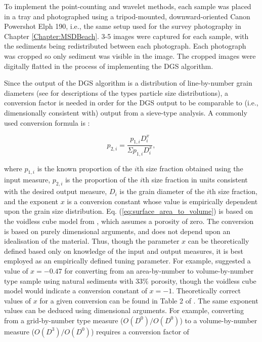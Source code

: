 To implement the point-counting and wavelet methods, each sample was placed in a tray and photographed using a tripod-mounted, downward-oriented Canon Powershot Elph 190, i.e., the same setup used for the survey photography in Chapter \ref{Chapter:MSDBeach}. 3-5 images were captured for each sample, with the sediments being redistributed between each photograph. Each photograph was cropped so only sediment was visible in the image. The cropped images were digitally flatted in the process of implementing the DGS algorithm.

Since the output of the DGS algorithm is a distribution of line-by-number grain diameters (see \citet{Kellerhals_Bray1971, Church_etal1987} for descriptions of the types particle size distributions), a conversion factor is needed in order for the DGS output to be comparable to (i.e., dimensionally consistent with) output from a sieve-type analysis. A commonly used conversion formula is \citep[e.g.][]{Kellerhals_Bray1971, Diplas_Sutherland1988, Cuttler_etal2017}:

\begin{equation}\label{eq:surface_area_to_volume}
p_{2,i} = \frac{p_{1,i} D_{i}^{x}}{\Sigma p_{1,i} D_{i}^{x}},
\end{equation}

\noindent where $p_{1,i}$ is the known proportion of the $i$th size fraction obtained using the input measure, $p_{2,i}$ is the proportion of the $i$th size fraction in units consistent with the desired output measure, $D_i$ is the grain diameter of the $i$th size fraction, and the exponent $x$ is a conversion constant whose value is empirically dependent upon the grain size distribution. Eq. (\ref{eq:surface_area_to_volume}) is based on the voidless cube model from \citet{Kellerhals_Bray1971}, which assumes a porosity of zero. The \citeauthor{Kellerhals_Bray1971} conversion is based on purely dimensional arguments, and does not depend upon an idealisation of the material. Thus, though the parameter $x$ can be theoretically defined based only on knowledge of the input and output measures, it is best employed as an empirically defined tuning parameter. For example, \citet{Diplas_Sutherland1988} suggested a value of $x=-0.47$ for converting from an area-by-number to volume-by-number type sample using natural sediments with 33\% porosity, though the voidless cube model would indicate a conversion constant of $x=-1$. Theoretically correct values of $x$ for a given conversion can be found in Table 2 of \citet{Kellerhals_Bray1971}. The same exponent values can be deduced using dimensional arguments. For example, converting from a grid-by-number type measure ($O(D^0)/O(D^0)$) to a volume-by-number measure ($O(D^3)/O(D^0)$) requires a conversion factor of 

